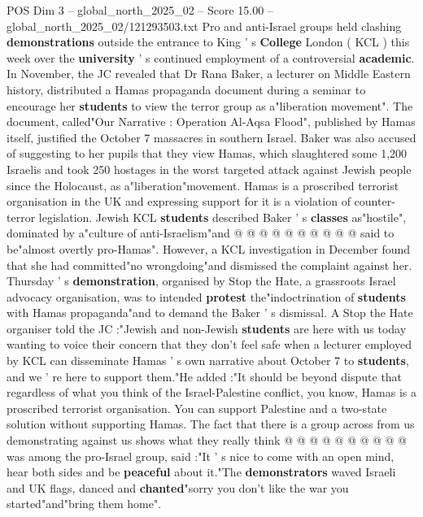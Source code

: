 \begin{textsample}{POS Dim 3 – global\_north\_2025\_02 – Score 15.00 – global\_north\_2025\_02/121293503.txt}  \label{ex:f3_pos_294}
Pro and anti-Israel groups held clashing \textbf{demonstrations} outside the entrance to King ' s \textbf{College} London ( KCL ) this week over the \textbf{university} ' s continued employment of a controversial \textbf{academic}.
In November, the JC revealed that Dr Rana Baker, a lecturer on Middle Eastern history, distributed a Hamas propaganda document during a seminar to encourage her \textbf{students} to view the terror group as a"liberation movement".
The document, called"Our Narrative : Operation Al-Aqsa Flood", published by Hamas itself, justified the October 7 massacres in southern Israel.
Baker was also accused of suggesting to her pupils that they view Hamas, which slaughtered some 1,200 Israelis and took 250 hostages in the worst targeted attack against Jewish people since the Holocaust, as a"liberation"movement.
Hamas is a proscribed terrorist organisation in the UK and expressing support for it is a violation of counter-terror legislation.
Jewish KCL \textbf{students} described Baker ' s \textbf{classes} as"hostile", dominated by a"culture of anti-Israelism"and @ @ @ @ @ @ @ @ @ @ said to be"almost overtly pro-Hamas".
However, a KCL investigation in December found that she had committed"no wrongdoing"and dismissed the complaint against her.
Thursday ' s \textbf{demonstration}, organised by Stop the Hate, a grassroots Israel advocacy organisation, was to intended \textbf{protest} the"indoctrination of \textbf{students} with Hamas propaganda"and to demand the Baker ' s dismissal.
A Stop the Hate organiser told the JC :"Jewish and non-Jewish \textbf{students} are here with us today wanting to voice their concern that they don't feel safe when a lecturer employed by KCL can disseminate Hamas ' s own narrative about October 7 to \textbf{students}, and we ' re here to support them."He added :"It should be beyond dispute that regardless of what you think of the Israel-Palestine conflict, you know, Hamas is a proscribed terrorist organisation.
You can support Palestine and a two-state solution without supporting Hamas.
The fact that there is a group across from us demonstrating against us shows what they really think @ @ @ @ @ @ @ @ @ @ was among the pro-Israel group, said :"It ' s nice to come with an open mind, hear both sides and be \textbf{peaceful} about it."The \textbf{demonstrators} waved Israeli and UK flags, danced and \textbf{chanted}"sorry you don't like the war you started"and"bring them home".

\end{textsample}
